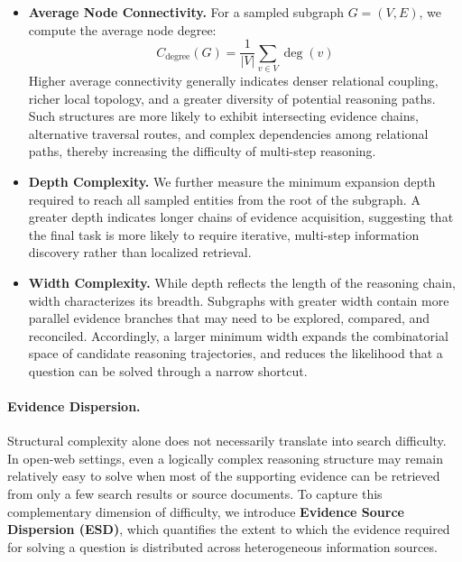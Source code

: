 \documentclass{huawei}
\begin{document}
\begin{itemize}[leftmargin=1em, listparindent=\parindent]
\item \textbf{Average Node Connectivity.} For a sampled subgraph $G=(V,E)$, we compute the average node degree:
\begin{equation}
C_{\text{degree}}(G)=\frac{1}{|V|}\sum_{v\in V}\deg(v)
\end{equation}
Higher average connectivity generally indicates denser relational coupling, richer local topology, and a greater diversity of potential reasoning paths. Such structures are more likely to exhibit intersecting evidence chains, alternative traversal routes, and complex dependencies among relational paths, thereby increasing the difficulty of multi-step reasoning.

\item \textbf{Depth Complexity.} We further measure the minimum expansion depth required to reach all sampled entities from the root of the subgraph. A greater depth indicates longer chains of evidence acquisition, suggesting that the final task is more likely to require iterative, multi-step information discovery rather than localized retrieval.

\item \textbf{Width Complexity.} While depth reflects the length of the reasoning chain, width characterizes its breadth. Subgraphs with greater width contain more parallel evidence branches that may need to be explored, compared, and reconciled. Accordingly, a larger minimum width expands the combinatorial space of candidate reasoning trajectories, and reduces the likelihood that a question can be solved through a narrow shortcut.
\end{itemize}

\paragraph{Evidence Dispersion.}
Structural complexity alone does not necessarily translate into search difficulty. In open-web settings, even a logically complex reasoning structure may remain relatively easy to solve when most of the supporting evidence can be retrieved from only a few search results or source documents. To capture this complementary dimension of difficulty, we introduce \textbf{Evidence Source Dispersion (ESD)}, which quantifies the extent to which the evidence required for solving a question is distributed across heterogeneous information sources.
\end{document}
